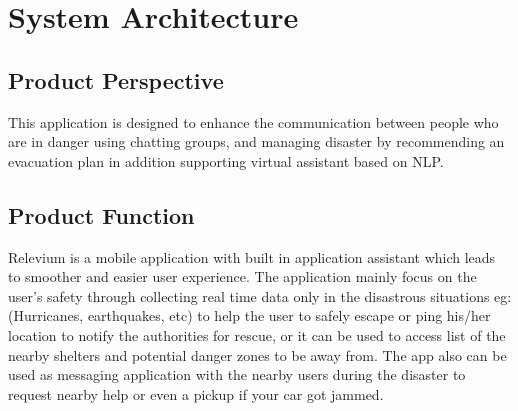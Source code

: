\documentclass{scrreprt}
\begin{document}
  \newpage

\chapter{System Architecture}

\section{Product Perspective}

This application is designed to enhance the communication between people who are in danger using chatting groups, and managing disaster by recommending an evacuation plan in addition supporting virtual assistant based on NLP.

\section{Product Function}

Relevium is a mobile application with built in application assistant which leads to smoother and easier user experience. The application mainly focus on the user's safety through collecting real time data only in the disastrous situations eg: (Hurricanes, earthquakes, etc) to help the user to safely escape or ping his/her location to notify the  authorities for rescue, or it can be used to access list of the nearby shelters and potential danger zones to be away from. The app also can be used as messaging application with the nearby users during the disaster to request nearby help or even a pickup if your car got jammed.
\end{document}
